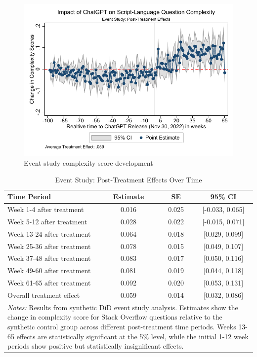 \begin{figure}[H]
    \centering
    \includegraphics[width=1\linewidth]{imgs/stata/event_study_nlp.pdf}
    \caption{Event study complexity score development}
    \label{fig:cscore_event_study}
\end{figure}

\begin{table}[H]
    \centering
    \caption{Event Study: Post-Treatment Effects Over Time}
    \label{tab:csscore_event_study}
    \begin{tabular}{lccc}
    \toprule
    Time Period & Estimate & SE & 95\% CI \\
    \midrule
    Week 1-4 after treatment   & 0.016 & 0.025 & [-0.033, 0.065] \\
    Week 5-12 after treatment  & 0.028 & 0.022 & [-0.015, 0.071] \\
    Week 13-24 after treatment & 0.064 & 0.018 & [0.029, 0.099] \\
    Week 25-36 after treatment & 0.078 & 0.015 & [0.049, 0.107] \\
    Week 37-48 after treatment & 0.083 & 0.017 & [0.050, 0.116] \\
    Week 49-60 after treatment & 0.081 & 0.019 & [0.044, 0.118] \\
    Week 61-65 after treatment & 0.092 & 0.020 & [0.053, 0.131] \\
    \midrule
    Overall treatment effect & 0.059 & 0.014 & [0.032, 0.086] \\
    \bottomrule
    \multicolumn{4}{p{0.85\linewidth}}{\footnotesize \textit{Notes:} Results from synthetic DiD event study analysis. Estimates show the change in complexity score for Stack Overflow questions relative to the synthetic control group across different post-treatment time periods. Weeks 13-65 effects are statistically significant at the 5\% level, while the initial 1-12 week periods show positive but statistically insignificant effects.} \\
    \end{tabular}
\end{table}


